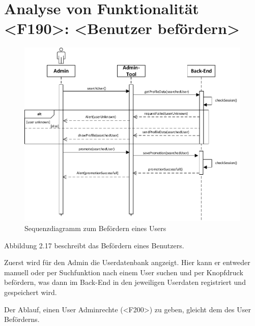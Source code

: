\section{Analyse von Funktionalität <F190>: <Benutzer befördern>}
\begin{figure}[h]
\centering
\includegraphics[width=1.3\textwidth]{figures/sequenz_F190.pdf}
\caption{Sequenzdiagramm zum Befördern eines Users}
\label{sequence}
\end{figure}
Abbildung 2.17 beschreibt das Befördern eines Benutzers.

Zuerst wird für den Admin die Userdatenbank angzeigt. Hier kann er entweder manuell oder per Suchfunktion nach einem User suchen und per Knopfdruck befördern, was dann im Back-End in den jeweiligen Userdaten registriert und gespeichert wird. 

Der Ablauf, einen User Adminrechte (<F200>) zu geben, gleicht dem des User Bef\"orderns.

\newpage
